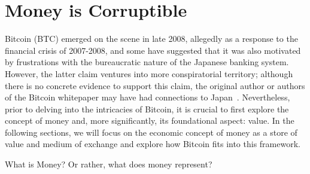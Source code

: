\section{Money is Corruptible}
Bitcoin (BTC) emerged on the scene in late 2008, allegedly as a response to the financial crisis of 2007-2008, and some
have suggested that it was also motivated by frustrations with the bureaucratic nature of the Japanese banking system.
However, the latter claim ventures into more conspiratorial territory; although there is no concrete evidence to support
this claim, the original author or authors of the Bitcoin whitepaper may have had connections to Japan~\cite{nakamoto2008bitcoin}.
Nevertheless, prior to delving into the intricacies of Bitcoin, it is crucial to first explore the concept of money and,
more significantly, its foundational aspect: value. In the following sections, we will focus on the economic concept of
money as a store of value and medium of exchange and explore how Bitcoin fits into this framework.

What is Money? Or rather, what does money represent?



